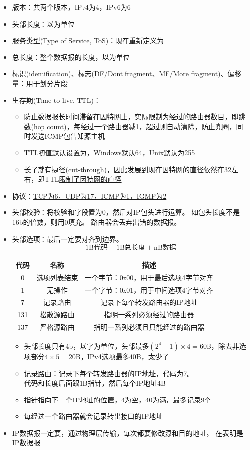 \begin{itemize}
\item 版本：共两个版本，IPv4为4，IPv6为6
\item 头部长度：以为单位
\item 服务类型(Type of Service, ToS)：现在重新定义为
\item 总长度：整个数据报的长度，以为单位
\item 标识(identification)、标志(DF/Dont fragment、MF/More fragment)、偏移量：用于划分片段
\item 生存期(Time-to-live, TTL)：
\begin{itemize}
	\item \underline{防止数据报长时间滞留在因特网上}，实际限制为经过的路由器数目，即跳数(hop count)，每经过一个路由器减1，超过则自动清除，防止兜圈，同时发送ICMP包告知源主机
	\item TTL初值默认设置为，Windows默认64，Unix默认为255
	\item 长了就有捷径(cut-through)，因此发展到现在因特网的直径依然在32左右，即TTL\underline{限制了因特网的直径}
\end{itemize}
\item 协议：\underline{TCP为6，UDP为17，ICMP为1，IGMP为2}
\item 头部校验：将校验和字段置为0，然后对IP包头进行运算。
如包头长度不是16b的倍数，则用0填充。
路由器会丢弃出错的数据报。
\item 头部选项：最后一定要对齐到边界。
\[\text{1B代码} + \text{1B总长度} + \text{nB数据}\]
\begin{center}
\begin{tabular}{|c|c|c|}\hline
代码 & 名称 & 描述\\\hline
0 & 选项列表结束 & 一个字节：0x00，用于最后选项4字节对齐\\\hline
1 & 无操作 & 一个字节：0x01，用于中间选项4字节对齐\\\hline
7 & 记录路由 & 记录下每个转发路由器的IP地址\\\hline
131 & 松散源路由 & 指明一系列必须经过的路由器\\\hline
137 & 严格源路由 & 指明一系列必须且只能经过的路由器\\\hline
\end{tabular}
\end{center}
\begin{itemize}
	\item 头部长度只有4b，以字为单位，头部最多$(2^4-1)\times 4=60$B，除去非选项部分$4\times 5=20$B，IPv4选项最多$40$B，太少了
	\item 记录路由：记录下每个转发路由器的IP地址，代码为7。\\
	代码和长度后面跟1B指针，然后每个IP地址4B
	\item 指针指向下一个IP地址的位置，\underline{4为空，40为满，最多记录9个}
	\item 每经过一个路由器就会记录转出接口的IP地址
\end{itemize}
\item IP数据报一定要，通过物理层传输，每次都要修改源和目的地址。
在表明是IP数据报
\end{itemize}

